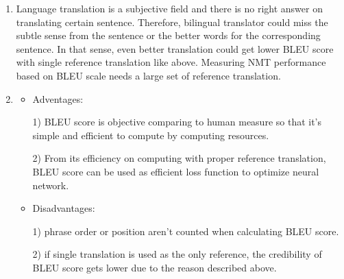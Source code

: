 \documentclass[a4paper]{article}
\begin{document}
\begin{enumerate}[label=(\alph*)]
\begin{enumerate}[label=\roman*.]
\begin{itemize}
            \end{itemize}

            \item Language translation is a subjective field and there is no right answer on translating certain sentence.
            Therefore, bilingual translator could miss the subtle sense from the sentence or the better words for the corresponding sentence. 
            In that sense, even better translation could get lower BLEU score with single reference translation like above.
            Measuring NMT performance based on BLEU scale needs a large set of reference translation.

            \item 
            
            \begin{itemize} 
                \item Adventages: 
                
                1) BLEU score is objective comparing to human measure so that it's simple and efficient to compute by computing resources. 
                
                2) From its efficiency on computing with proper reference translation, BLEU score can be used as efficient loss function to optimize neural network.
                \item Disadvantages: 
                
                1) phrase order or position aren't counted when calculating BLEU score. 
                
                2) if single translation is used as the only reference, the credibility of BLEU score gets lower due to the reason described above.
            \end{itemize}

        \end{enumerate}    

    \end{enumerate}
\end{document}
